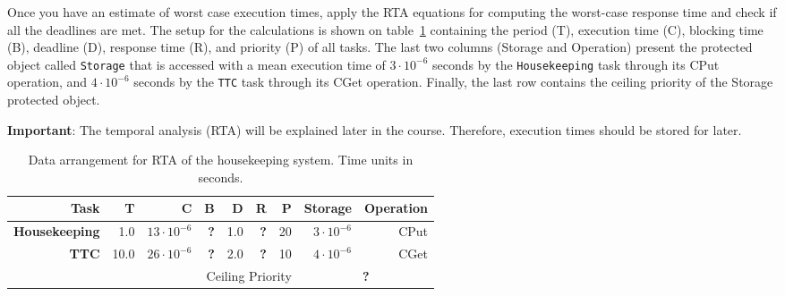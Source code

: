 Once you have an estimate of worst case execution times, apply the RTA equations for computing the worst-case response time and check if all the deadlines are met. The setup for the calculations is shown on table~\ref{tb:wcet}
containing the period (T), execution time (C),
blocking time (B), deadline (D),
response time (R), and priority (P) of all tasks.
The last two columns (Storage and Operation)
present the protected object called \texttt{Storage}
that is accessed with a mean execution time of
$3\cdot10^{-6}$ seconds by the \texttt{Housekeeping} task through its CPut operation,
and $4\cdot10^{-6}$ seconds by the \texttt{TTC} task through its CGet operation.
Finally, the last row contains the ceiling priority of the Storage protected object.

\textcolor{mRedBrown}{\textbf{Important}}: The temporal analysis (RTA) will be explained later in the course. Therefore, execution times should be stored for later. 

\begingroup
\setlength{\tabcolsep}{8pt} %
\renewcommand{\arraystretch}{1.2} %

\begin{table}[htb]
\begin{center}
	
	\small %
	
	\begin{tabular}{|r r r r r r r |r r|} \hline
	\textbf{Task} & T & C & B & D & R & P & Storage & Operation\\ \hline
	
	\textbf{Housekeeping} & 1.0 & $13\cdot10^{-6}$ & \textcolor{mRedBrown}{\textbf{?}} & 1.0 & \textcolor{mRedBrown}{\textbf{?}} & 20 & $3\cdot10^{-6}$ & CPut \\
	
	\textbf{TTC} & 10.0 & $26\cdot10^{-6}$ & \textcolor{mRedBrown}{\textbf{?}} & 2.0 & \textcolor{mRedBrown}{\textbf{?}} & 10 & $4\cdot10^{-6}$ & CGet \\ \hline
	
	\multicolumn{7}{|r|}{Ceiling Priority} & \multicolumn{2}{|c|}{\textcolor{mRedBrown}{\textbf{?}}} \\ \hline
	\end{tabular}
	\caption{Data arrangement for RTA of the housekeeping system. Time units in seconds.}
	\label{tb:wcet}
\end{center}
\end{table}

\endgroup

